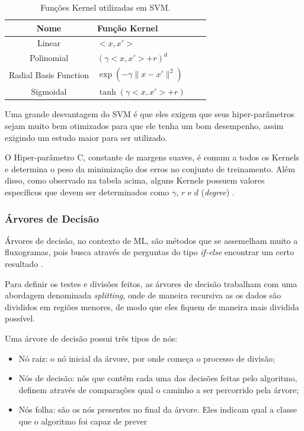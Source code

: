 \begin{table}[h]
\centering
\begin{tabular}{|c p{5cm}|l p{5cm}}
\hline
\textbf{\small Nome} & \textbf{\small Função Kernel}\\\hline \hline
{\small Linear} & {\small $<x,x'>$}\\\hline
{\small Polinomial} & {\small $(\gamma<x,x'> + r)^{d}$}\\\hline
{\small Radial Basis Function} & {\small $\exp(-\gamma \parallel x - x' \parallel^{2})$}\\\hline
{\small Sigmoidal} & {\small $\tanh(\gamma<x,x'> + r)$}\\\hline
\end{tabular}
\caption{Funções Kernel utilizadas em SVM.}
\label{t.kernels}
\end{table}

Uma grande desvantagem do SVM é que eles exigem que seus hiper-parâmetros sejam muito bem otimizados para que ele tenha um bom desempenho, assim exigindo um estudo maior para ser utilizado. 

O Hiper-parâmetro C, constante de margens suaves, é comum a todos os Kernels e determina o peso da minimização dos erros no conjunto de treinamento. Além disso, como observado na tabela acima, alguns Kernels possuem valores específicos que devem ser determinados como $\gamma$, $r$ e $d$ (\textit{degree}) \cite{lorena2007introduccao}.

\subsubsection{Árvores de Decisão}

Árvores de decisão, no contexto de ML, são métodos que se assemelham muito a fluxogramas, pois busca através de perguntas do tipo \textit{if-else} encontrar um certo resultado \cite{harrington2012machine}.

Para definir os testes e divisões feitos, as árvores de decisão trabalham com uma abordagem denominada \textit{splitting}, onde de maneira recursiva as os dados são divididos em regiões menores, de modo que eles fiquem de maneira mais dividida possível.

Uma árvore de decisão possui três tipos de nós:

\begin{itemize}
    \item Nó raiz: o nó inicial da árvore, por onde começa o processo de divisão;
    \item Nós de decisão: nós que contêm cada uma das decisões feitas pelo algoritmo, definem através de comparações qual o caminho a ser percorrido pela árvore;
    \item Nós folha: são os nós presentes no final da árvore. Eles indicam qual a classe que o algoritmo foi capaz de prever
\end{itemize}


